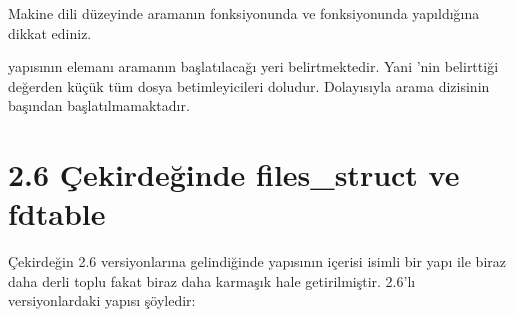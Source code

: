 \documentclass[a4paper,10pt,turkish]{sphinxmanual}
\begin{document}
\begin{sphinxVerbatim}[commandchars=\\\{\}]
\end{sphinxVerbatim}

\sphinxAtStartPar
Makine dili düzeyinde aramanın  fonksiyonunda ve  fonksiyonunda yapıldığına dikkat
ediniz.

\sphinxAtStartPar
{} yapısının  elemanı aramanın başlatılacağı yeri belirtmektedir. Yani
’nin belirttiği değerden küçük tüm dosya betimleyicileri doludur. Dolayısıyla arama
 dizisinin başından başlatılmamaktadır.


\section{2.6 Çekirdeğinde files\_struct ve fdtable}
\label{\detokenize{filesystem1:cekirdeginde-files-struct-ve-fdtable}}
\sphinxAtStartPar
Çekirdeğin 2.6 versiyonlarına gelindiğinde  yapısının içerisi  isimli
bir yapı ile biraz daha derli toplu fakat biraz daha karmaşık hale getirilmiştir. 2.6’lı
versiyonlardaki  yapısı şöyledir:
\end{document}
